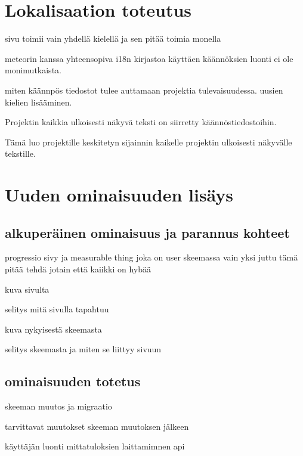 \documentclass[11pt,a4paper,titlepage,oneside]{article}
\begin{document}
\section{Lokalisaation toteutus}

sivu toimii vain yhdellä kielellä ja sen pitää toimia monella
\medskip


meteorin kanssa yhteensopiva i18n kirjastoa käyttäen käännöksien luonti ei ole monimutkaista.






miten käännpös tiedostot tulee auttamaan projektia tulevaisuudessa. uusien kielien lisääminen.

Projektin kaikkia ulkoisesti näkyvä teksti on siirretty käännöstiedostoihin. 

Tämä luo projektille keskitetyn sijainnin kaikelle projektin ulkoisesti näkyvälle tekstille.










\section{Uuden ominaisuuden lisäys}

\subsection{alkuperäinen ominaisuus ja parannus kohteet}
progressio sivy ja measurable thing joka on user skeemassa vain yksi juttu
tämä pitää tehdä jotain että kaiikki on hybää
\medskip

kuva sivulta

selitys mitä sivulla tapahtuu
\medskip

kuva nykyisestä skeemasta

selitys skeemasta ja miten se liittyy sivuun
\medskip



\subsection{ominaisuuden totetus}

skeeman muutos ja migraatio


tarvittavat muutokset skeeman muutoksen jälkeen


käyttäjän luonti
mittatuloksien laittamimnen api
\end{document}
